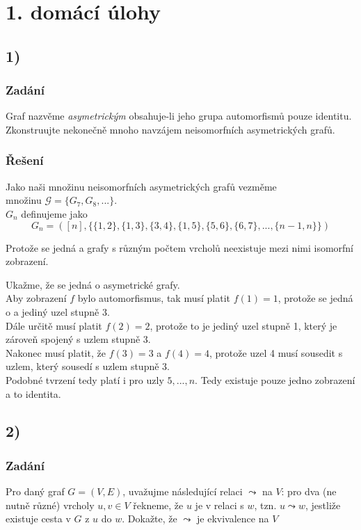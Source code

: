 \documentclass[../main.tex]{subfiles}
\begin{document}
\section{1. domácí úlohy}

\subsection{1)}
\subsubsection*{Zadání}
Graf nazvěme \textit{asymetrickým} obsahuje-li jeho grupa automorfismů pouze identitu.
Zkonstruujte nekonečně mnoho navzájem neisomorfních asymetrických grafů.
\subsubsection*{Řešení}
Jako naši množinu neisomorfních asymetrických grafů vezměme\\ množinu $\mathcal{G} = \{G_7, G_8, ...\}$.\\
$G_n$ definujeme jako
\begin{equation*}
    G_n = ([n], \{\{ 1,2 \}, \{ 1,3\}, \{ 3,4 \}, \{ 1,5 \}, \{ 5,6 \}, \{ 6,7 \}, ..., \{ n-1, n \} \} )
\end{equation*}

Protože se jedná a grafy s různým počtem vrcholů neexistuje mezi nimi isomorfní zobrazení. 

Ukažme, že se jedná o asymetrické grafy.\\
Aby zobrazení $f$ bylo automorfismus, tak musí platit $f(1) = 1$, protože se jedná o a jediný uzel stupně 3.\\
Dále určitě musí platit $f(2) = 2$, protože to je jediný uzel stupně 1, který je zároveň spojený s uzlem stupně 3.\\
Nakonec musí platit, že $f(3) = 3$ a $f(4) = 4$, protože uzel 4 musí sousedit s uzlem, který sousedí s uzlem stupně 3.\\
Podobné tvrzení tedy platí i pro uzly $5, ..., n$. Tedy existuje pouze jedno zobrazení a to identita. 




\subsection{2)}
\subsubsection*{Zadání}
Pro daný graf $G=(V,E)$, uvažujme následující relaci $\leadsto$ na $V$: pro dva (ne nutně různé) vrcholy $u,v\in V$ řekneme, že 
$u$ je v relaci s $w$, tzn. $u\leadsto w$, jestliže existuje cesta v $G$ z $u$ do $w$. Dokažte, že $\leadsto$ je ekvivalence na $V$
\end{document}
